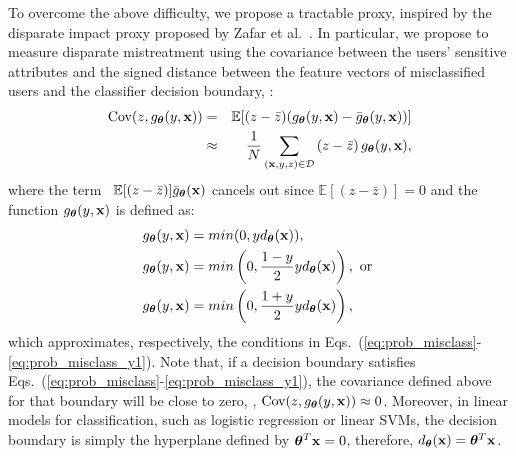 \documentclass[letterpaper]{sig-alternate-2013}
\newcommand{\disc}{disparate mistreatment}
\begin{document}
To overcome the above difficulty, we propose a tractable proxy, inspired by the disparate impact proxy proposed by
Zafar et al.~\cite{zafar_fairness}. In particular, we propose to measure \disc{} using the covariance between the users'{}
sensitive attributes and the signed distance between the feature vectors of misclassified users and the classifier decision
boun\-dary, \ie:
\begin{eqnarray} \label{eq:fairness-proxy}
\nonumber
\mathrm{Cov}(z, g_{ \boldsymbol{\theta}}(y, \mathbf{x})) &=&   \mathbb{E}[ (z - \bar{z}) (g_{ \boldsymbol{\theta}}(y, \mathbf{x}) -  \bar{g}_{\boldsymbol{\theta}}(y, \mathbf{x})) ] \\
& \approx& \frac{1}{N} \sum_{(\mathbf{x},y,z) \in \mathcal{D}} \left(z - \bar{z}\right) g_{\boldsymbol{\theta}}(y, \mathbf{x}) ,
\end{eqnarray}
\noindent
where the term \ $\mathbb{E}[ (z - \bar{z}) ]  \bar{g}_{\boldsymbol{\theta}}(\mathbf{x})$ cancels out since $\mathbb{E}[ (z - \bar{z}) ] = 0$ and
the function $g_{\boldsymbol{\theta}}(y,\mathbf{x})$ is defined as:
\begin{align}
g_{ \boldsymbol{\theta}}(y, \mathbf{x}) &= min(0, y d_{\boldsymbol{\theta}}(\mathbf{x})), \label{eq:g_misclass} \\
g_{\boldsymbol{\theta}}(y,\mathbf{x}) &= min\left(0, \frac{1-y}{2} y d_{\boldsymbol{\theta}}(\mathbf{x})\right),  \mbox{ or } \label{eq:g_fpr} \\
g_{\boldsymbol{\theta}}(y, \mathbf{x}) &= min\left(0, \frac{1+y}{2} y d_{\boldsymbol{\theta}}(\mathbf{x})\right), \label{eq:g_fnr}
\end{align}
which approximates, respectively, the conditions in Eqs.~(\ref{eq:prob_misclass}-\ref{eq:prob_misclass_y1}).
Note that, if a decision boundary satisfies Eqs.~(\ref{eq:prob_misclass}-\ref{eq:prob_misclass_y1}), the covariance defined above for that
boundary will be close to zero, \ie, $\mathrm{Cov}(z, g_{\boldsymbol{\theta}}(y, \mathbf{x}))\approx 0$.
Moreover, in linear models for classification, such as logistic regression or linear SVMs, the decision boun\-dary is simply the
hyperplane defined by $\boldsymbol{\theta}^{T} \mathbf{x} = 0$, therefore, $d_{\boldsymbol{\theta}}(\mathbf{x}) = \boldsymbol{\theta}^{T} \mathbf{x}$.
\end{document}
